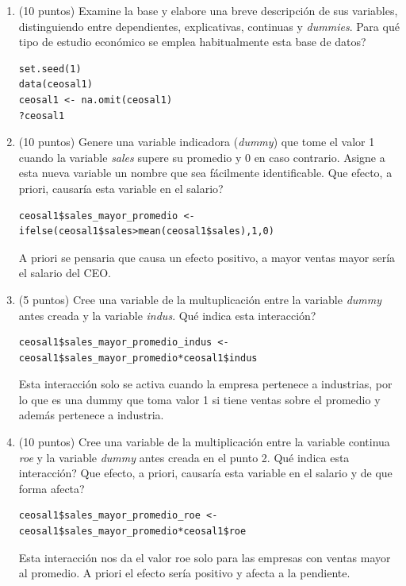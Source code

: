 \documentclass[letterpaper,11pt]{article}
\begin{document}
\begin{enumerate}

\item (10 puntos) Examine la base y elabore una breve descripción de sus variables, distinguiendo entre dependientes, explicativas, continuas y \textit{dummies}. \textquestiondown Para qué tipo de estudio económico se emplea habitualmente esta base de datos?

\begin{lstlisting}
set.seed(1)
data(ceosal1)
ceosal1 <- na.omit(ceosal1)
?ceosal1
\end{lstlisting}

    \item (10 puntos) Genere una variable indicadora (\textit{dummy}) que tome el valor 1 cuando la variable \textit{sales} supere su promedio y 0 en caso contrario. Asigne a esta nueva variable un nombre que sea fácilmente identificable. \textquestiondown Que efecto, a priori, causaría esta variable en el salario?
    
\begin{lstlisting}
ceosal1$sales_mayor_promedio <- ifelse(ceosal1$sales>mean(ceosal1$sales),1,0)
\end{lstlisting}
A priori se pensaria que causa un efecto positivo, a mayor ventas mayor sería el salario del CEO.

    \item (5 puntos) Cree una variable de la multuplicación entre la variable \textit{dummy} antes creada y la variable \textit{indus}. \textquestiondown Qué indica esta interacción? 

\begin{lstlisting}
ceosal1$sales_mayor_promedio_indus <- ceosal1$sales_mayor_promedio*ceosal1$indus
\end{lstlisting} 
Esta interacción solo se activa cuando la empresa pertenece a industrias, por lo que es una dummy que toma valor 1 si tiene ventas sobre el promedio y además pertenece a industria.


    \item (10 puntos) Cree una variable de la multiplicación entre la variable continua \textit{roe}  y la variable \textit{dummy} antes creada en el punto 2. \textquestiondown Qué indica esta interacción? \textquestiondown Que efecto, a priori, causaría esta variable en el salario y de que forma afecta?

\begin{lstlisting}
ceosal1$sales_mayor_promedio_roe <- ceosal1$sales_mayor_promedio*ceosal1$roe
\end{lstlisting} 
Esta interacción nos da el valor roe solo para las empresas con ventas mayor al promedio. A priori el efecto sería positivo y afecta a la pendiente.


\end{enumerate}
\end{document}
